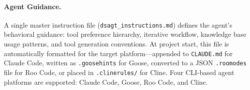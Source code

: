 \documentclass[11pt]{article}
\begin{document}
\paragraph{Agent Guidance.}
A single master instruction file
(\texttt{dsagt\_instructions.md}) defines the agent's
behavioral guidance: tool preference hierarchy, iterative
workflow, knowledge base usage patterns, and tool generation
conventions.
At project start, this file is automatically formatted for
the target platform---appended to \texttt{CLAUDE.md} for
Claude Code, written as \texttt{.goosehints} for Goose,
converted to a JSON \texttt{.roomodes} file for Roo Code,
or placed in \texttt{.clinerules/} for Cline.
Four CLI-based agent platforms are supported: Claude Code,
Goose, Roo Code, and Cline.

\end{document}
